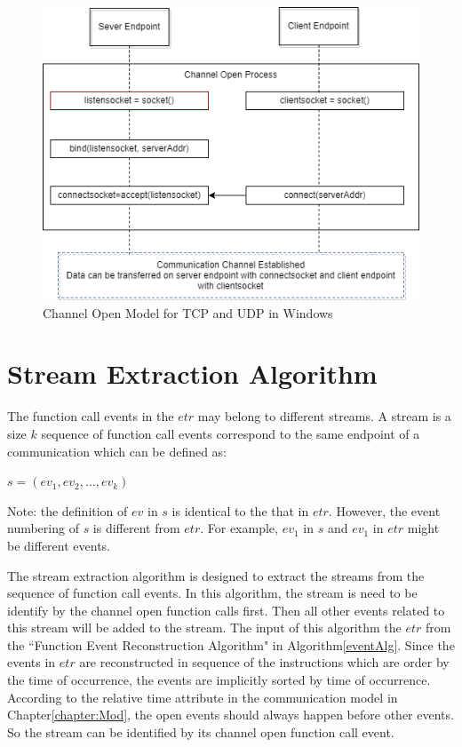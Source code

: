 \begin{figure}[H]
\centerline{\includegraphics[scale=0.55]{Figures/tcpudpchannelopen}}
 \caption{Channel Open Model for TCP and UDP in Windows}
\label{channelopen2}    
\end{figure}

\section{Stream Extraction Algorithm}
The function call events in the $etr$ may belong to different streams. A stream is a size $k$ sequence of function call events correspond to the same endpoint of a communication which can be defined as:

$s = (ev_1, ev_2, ..., ev_k)$

Note: the definition of $ev$ in $s$ is identical to the that in $etr$. However, the event numbering of $s$ is different from $etr$. For example, $ev_1$ in $s$ and $ev_1$ in $etr$ might be different events.

The stream extraction algorithm is designed to extract the streams from the sequence of function call events. In this algorithm, the stream is need to be identify by the channel open function calls first. Then all other events related to this stream will be added to the stream.
The input of this algorithm the $etr$ from the ``Function Event Reconstruction Algorithm" in Algorithm\ref{eventAlg}. Since the events in $etr$ are reconstructed in sequence of the instructions which are order by the time of occurrence, the events are implicitly sorted by time of occurrence. According to the relative time attribute in the communication model in Chapter\ref{chapter:Mod}, the open events should always happen before other events. So the stream can be identified by its channel open function call event. 

